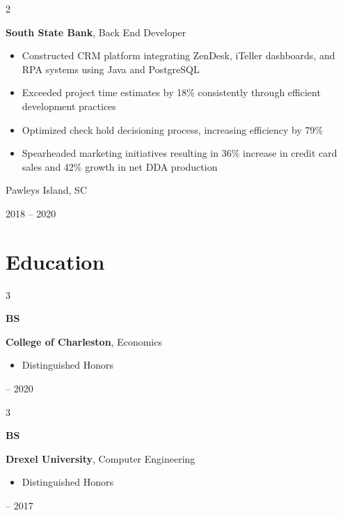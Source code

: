 \documentclass[10pt, letterpaper]{article}
\newenvironment{highlights}{
    \begin{itemize}[
        topsep=0.10 cm,
        parsep=0.10 cm,
        partopsep=0pt,
        itemsep=0pt,
        leftmargin=0.4 cm + 10pt
    ]
}{
    \end{itemize}
} %
\newenvironment{twocolentry}[2][]{
    \onecolentry
    \def\secondColumn{#2}
    \setcolumnwidth{\fill, 4.5 cm}
    \begin{paracol}{2}
}{
    \switchcolumn \raggedleft \secondColumn
    \end{paracol}
    \endonecolentry
} %
\newenvironment{threecolentry}[3][]{
    \onecolentry
    \def\thirdColumn{#3}
    \setcolumnwidth{1 cm, \fill, 4.5 cm}
    \begin{paracol}{3}
    {\raggedright #2} \switchcolumn
}{
    \switchcolumn \raggedleft \thirdColumn
    \end{paracol}
    \endonecolentry
} %
\begin{document}
        \vspace{0.2 cm}

        \begin{twocolentry}{
            Pawleys Island, SC

        2018 – 2020
        }
            \textbf{South State Bank}, Back End Developer
            \begin{highlights}
                \item Constructed CRM platform integrating ZenDesk, iTeller dashboards, and RPA systems using Java and PostgreSQL
                \item Exceeded project time estimates by 18\% consistently through efficient development practices
                \item Optimized check hold decisioning process, increasing efficiency by 79\%
                \item Spearheaded marketing initiatives resulting in 36\% increase in credit card sales and 42\% growth in net DDA production
            \end{highlights}
        \end{twocolentry}



    
    \section{Education}



        
        \begin{threecolentry}{\textbf{BS}}{
            2019 – 2020
        }
            \textbf{College of Charleston}, Economics
            \begin{highlights}
                \item Distinguished Honors
            \end{highlights}
        \end{threecolentry}

        \vspace{0.2 cm}

        \begin{threecolentry}{\textbf{BS}}{
            2014 – 2017
        }
            \textbf{Drexel University}, Computer Engineering
            \begin{highlights}
                \item Distinguished Honors
            \end{highlights}
        \end{threecolentry}


    
\end{document}
